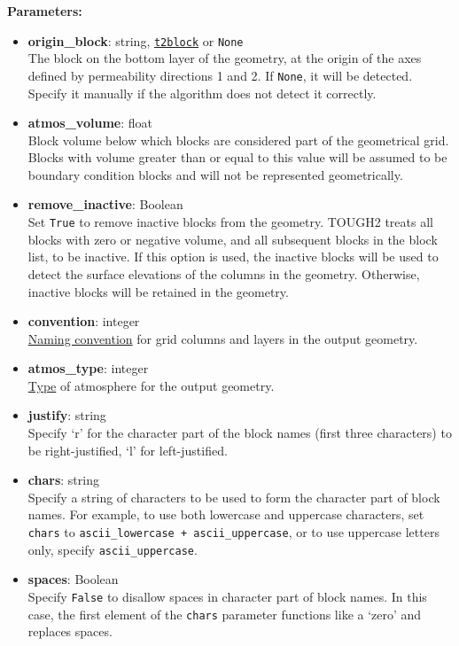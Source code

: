 \textbf{Parameters:}
\begin{itemize}
\item \textbf{origin\_block}: string, \hyperref[t2blockobjects]{\texttt{t2block}} or \texttt{None}\\
  The block on the bottom layer of the geometry, at the origin of the axes defined by permeability directions 1 and 2. If \texttt{None}, it will be detected. Specify it manually if the algorithm does not detect it correctly.
  \item \textbf{atmos\_volume}: float\\
    Block volume below which blocks are considered part of the geometrical grid. Blocks with volume greater than or equal to this value will be assumed to be boundary condition blocks and will not be represented geometrically.
  \item \textbf{remove\_inactive}: Boolean\\
    Set \texttt{True} to remove inactive blocks from the geometry. TOUGH2 treats all blocks with zero or negative volume, and all subsequent blocks in the block list, to be inactive. If this option is used, the inactive blocks will be used to detect the surface elevations of the columns in the geometry. Otherwise, inactive blocks will be retained in the geometry.
\item \textbf{convention}: integer\\
  \hyperref[geometry_format_conventions]{Naming convention} for grid columns and layers in the output geometry.
\item \textbf{atmos\_type}: integer\\
  \hyperref[geometry_format_conventions]{Type} of atmosphere for the output geometry.
\item \textbf{justify}: string\\
  Specify `r' for the character part of the block names (first three characters) to be right-justified, `l' for left-justified.
\item \textbf{chars}: string\\
  Specify a string of characters to be used to form the character part of block names.  For example, to use both lowercase and uppercase characters, set \texttt{chars} to \texttt{ascii\_lowercase + ascii\_uppercase}, or to use uppercase letters only, specify \texttt{ascii\_uppercase}.
\item \textbf{spaces}: Boolean\\
  Specify \texttt{False} to disallow spaces in character part of block names. In this case, the first element of the \texttt{chars} parameter functions like a `zero' and replaces spaces.

\end{itemize}
